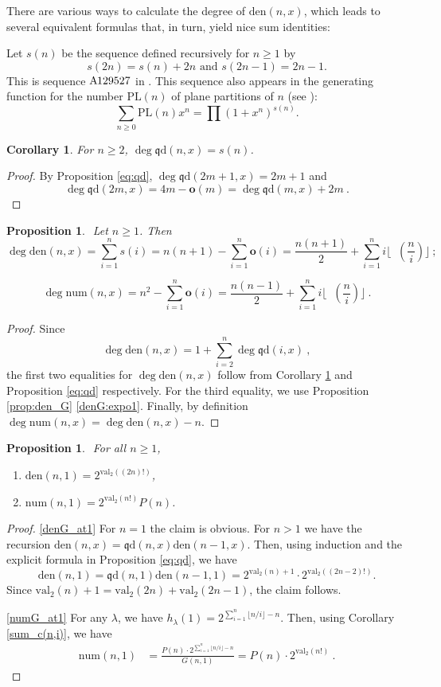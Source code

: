\documentclass[reqno]{amsart}
\def\den{\mathrm{den}}
\def\num{\mathrm{num}}
\def\val{\mathrm{val}}
\def\rd{\mathrm{\mathfrak q d}}
\def\A{\mathrm{A}\hspace{-.015cm}}
\def\o{\mathbf o}
\DeclareMathOperator{\lb}{\log_2}
\newtheorem{corollary}[theorem]{Corollary}
\newtheorem{proposition}[theorem]{Proposition}
\theoremstyle{definition}
\begin{document}
There are various ways to calculate the degree of $\den(n,x)$, which leads to several equivalent formulas that, in turn, yield nice sum identities:

Let $s(n)$ be the sequence defined recursively for $n\geq 1$ by 
\[s(2n) = s(n)+2n\textrm{ \ \ \ and\ \ \ } s(2n-1) = 2n-1.\]
 This is sequence $\A129527$ in \cite{OEIS}. This sequence also appears in the generating function for the number $\mathrm{PL}(n)$ of plane partitions of $n$ (see \cite{BM24}): $$\sum_{n\geq 0} \mathrm{PL}(n)x^n=\prod(1+x^n)^{s(n)}.$$

\begin{corollary}\label{dG:recursion} 
    For $n\geq 2$,  $\deg\rd(n,x)=s(n)$.
\end{corollary}
\begin{proof}
By Proposition \ref{eq:qd}, $\deg\rd(2m+1,x)=2m+1$ and
    \[ \deg\rd(2m,x)=4m-\o(m)=\deg\rd(m,x)+2m\:.\]
\end{proof}
\begin{proposition}\label{rd} $ $ Let $n\geq 1$. Then
\[
\deg\den(n,x)=\sum_{i=1}^ns(i)=n(n+1)-\sum_{i=1}^n\o(i)=\frac{n(n+1)}{2}+\sum_{i=1}^n i\lfloor\lb(\frac{n}{i})\rfloor\: ;\]

$$\deg\num(n,x)=n^2-\sum_{i=1}^n\o(i)= \frac{n(n-1)}{2}+\sum_{i=1}^n i\lfloor\lb(\frac{n}{i})\rfloor \:.$$
    \end{proposition}
\begin{proof} Since \[\deg\den(n,x)=1+ \sum_{i=2}^n\deg\rd(i,x)\:,\] the first two equalities for $\deg\den(n,x)$ follow from Corollary \ref{dG:recursion} and Proposition \ref{eq:qd} respectively. 
For the third equality,  we  use Proposition \ref{prop:den_G} \ref{denG:expo1}. Finally, by definition $\deg\num(n,x)=\deg\den(n,x)-n$.
\end{proof}
\begin{proposition}\label{conjwas10}$ $ For all $n\geq 1$,
\begin{enumerate}[label=(\alph*)]
    \item\label{denG_at1}   $\den(n,1)=2^{\val_2((2n)!)}$,
    \item\label{numG_at1}  $\num(n,1)=2^{\val_2(n!)}P(n)$.
\end{enumerate}  
\end{proposition}
\begin{proof}
 \ref{denG_at1}   For $n=1$ the claim is obvious. For $n>1$ we have the recursion $\den(n,x)=\rd(n,x)\den(n-1,x)$. Then, using induction and the explicit formula  in Proposition \eqref{eq:qd}, we have 
 $$\den(n,1)=\rd(n,1)\den(n-1,1)=2^{\val_2(n)+1}\cdot 2^{\val_2((2n-2)!)}.$$
 Since $\val_2(n)+1=\val_2(2n)+\val_2(2n-1)$, the claim follows.

\ref{numG_at1}  For any $\lambda$, we have $h_\lambda(1)=2^{\sum_{i=1}^n\lfloor n/i\rfloor-n}$. Then, using Corollary \ref{sum_c(n,i)}, we have 
\begin{align*}
    \num(n,1)&=\frac{P(n)\cdot 2^{\sum_{i=1}^n\lfloor n/i\rfloor-n}}{G(n,1)}
    =P(n)\cdot 2^{\val_2(n!)}\:.
\end{align*}
\end{proof}
\end{document}
